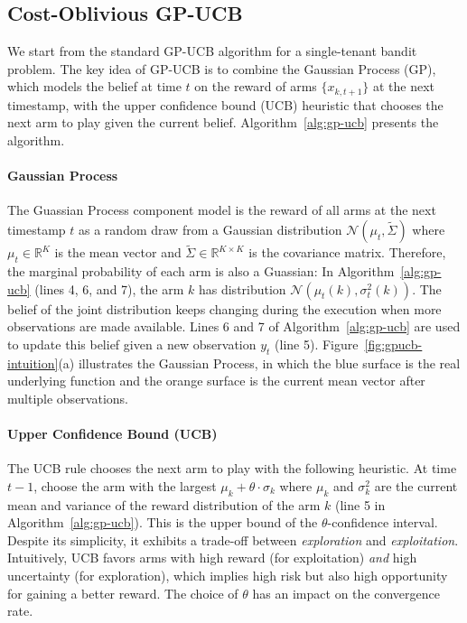 \documentclass[letterpaper]{vldb}
\begin{document}
\subsection{Cost-Oblivious GP-UCB}

We start from the standard GP-UCB algorithm for a single-tenant bandit problem.
The key idea of GP-UCB is to combine the Gaussian Process (GP),
which models the belief at time $t$ on the reward of arms $\{x_{k,{t+1}}\}$
at the next timestamp, with the upper confidence bound (UCB) 
heuristic that chooses the next arm to play given the current belief.
Algorithm~\ref{alg:gp-ucb} presents the algorithm.


\vspace{-0.75em}
\paragraph*{Gaussian Process} The Guassian Process component model is
the reward of all arms at the next timestamp $t$ as a random draw from a 
Gaussian distribution
$\mathcal{N}(\mu_t, \tilde{\Sigma})$ where $\mu_t \in \mathbb{R}^K$ is the
mean vector and $\tilde{\Sigma} \in \mathbb{R}^{K \times K}$ is the covariance
matrix. Therefore, the marginal probability of each arm is also a Guassian:
In Algorithm~\ref{alg:gp-ucb} (lines 4, 6, and 7), the arm $k$ has distribution
$\mathcal{N}(\mu_t(k), \sigma_t^2(k))$. The belief of the joint distribution
keeps changing during the execution when more observations are made
available. Lines 6 and 7 of Algorithm~\ref{alg:gp-ucb} are used to
update this belief given a new observation $y_t$ (line 5).
Figure~\ref{fig:gpucb-intuition}(a) illustrates the Gaussian Process, in which
the blue surface is the real underlying function and the orange
surface is the current mean vector after multiple observations.


\vspace{-0.75em}
\paragraph*{Upper Confidence Bound (UCB)} The UCB rule
chooses the next arm to play with the following heuristic. At time $t-1$,
choose the arm with the largest $\mu_k + \theta\cdot\sigma_k$ where 
$\mu_k$ and $\sigma_k^2$ are the current mean and variance of the 
reward distribution of the arm $k$ (line 5 in Algorithm~\ref{alg:gp-ucb}). 
This is the upper bound of the $\theta$-confidence interval.
Despite its simplicity, it exhibits a trade-off between \emph{exploration} and \emph{exploitation}.
Intuitively, UCB favors arms with high reward (for exploitation) \emph{and} high uncertainty (for exploration), which implies high risk but also high opportunity for gaining a better reward.
The choice of $\theta$ has an impact on the convergence rate.
\end{document}
